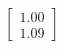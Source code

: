 \documentclass[preview]{standalone}
\begin{document}
\begin{align*}
\begin{bmatrix} 1.00 \\ 1.09 \end{bmatrix}
\end{align*}
\end{document}
